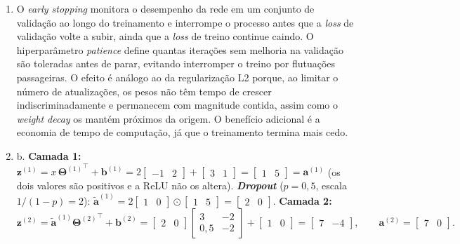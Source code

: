 \documentclass{dlproblemset}
\begin{document}
\begin{enumerate}[1)]
    \item O \textit{early stopping} monitora o desempenho da rede em um conjunto de validação ao longo do treinamento e interrompe o processo antes que a \textit{loss} de validação volte a subir, ainda que a \textit{loss} de treino continue caindo. O hiperparâmetro \textit{patience} define quantas iterações sem melhoria na validação são toleradas antes de parar, evitando interromper o treino por flutuações passageiras. O efeito é análogo ao da regularização L2 porque, ao limitar o número de atualizações, os pesos não têm tempo de crescer indiscriminadamente e permanecem com magnitude contida, assim como o \textit{weight decay} os mantém próximos da origem. O benefício adicional é a economia de tempo de computação, já que o treinamento termina mais cedo.


    \item b. \textbf{Camada 1:} $\mathbf{z}^{(1)} = x\,{\mathbf{\Theta}^{(1)}}^{\top} + \mathbf{b}^{(1)} = 2\begin{bmatrix} -1 & 2 \end{bmatrix} + \begin{bmatrix} 3 & 1 \end{bmatrix} = \begin{bmatrix} 1 & 5 \end{bmatrix} = \mathbf{a}^{(1)}$ (os dois valores são positivos e a ReLU não os altera). \textbf{\textit{Dropout}} ($p = 0{,}5$, escala $1/(1-p) = 2$): $\widetilde{\mathbf{a}}^{(1)} = 2\begin{bmatrix} 1 & 0 \end{bmatrix} \odot \begin{bmatrix} 1 & 5 \end{bmatrix} = \begin{bmatrix} 2 & 0 \end{bmatrix}$. \textbf{Camada 2:}
    \[
    \mathbf{z}^{(2)} = \widetilde{\mathbf{a}}^{(1)}{\mathbf{\Theta}^{(2)}}^{\top} + \mathbf{b}^{(2)}
    = \begin{bmatrix} 2 & 0 \end{bmatrix}\begin{bmatrix} 3 & -2 \\ 0{,}5 & -2 \end{bmatrix} + \begin{bmatrix} 1 & 0 \end{bmatrix}
    = \begin{bmatrix} 7 & -4 \end{bmatrix},
    \qquad
    \mathbf{a}^{(2)} = \begin{bmatrix} 7 & 0 \end{bmatrix}.
\]
\end{enumerate}
\end{document}
